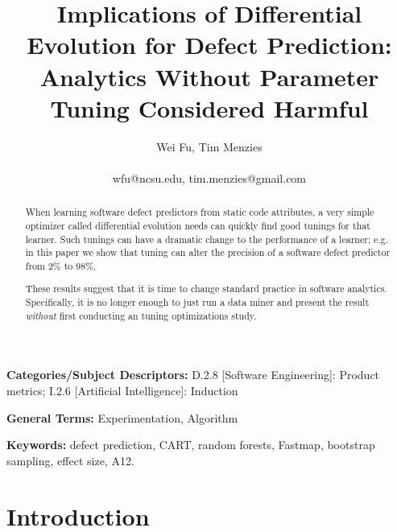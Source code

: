 \documentclass{sig-alternative}
\begin{document}
\title{Implications of Differential Evolution for  Defect Prediction:
Analytics Without Parameter Tuning Considered Harmful}
\author{
\alignauthor
Wei Fu, Tim Menzies\\
       \\
       {wfu@ncsu.edu, tim.menzies@gmail.com}} 


 
\maketitle
\begin{abstract}
When learning
software defect predictors from static code attributes,   a
very simple optimizer called differential evolution needs can quickly
find  good tunings for that learner.
Such tunings can have a dramatic change to the performance of a learner;
e.g. in this paper we show that tuning can alter the precision of
a software defect predictor from 2\% to 98\%.

These results suggest that it is time to change standard practice in
software analytics. Specifically,
it is no longer enough to just run a data miner and present the result
{\em without} first conducting an tuning optimizations study.


\end{abstract}

\vspace{1mm}
\noindent
{\bf Categories/Subject Descriptors:} 
D.2.8 [Software Engineering]: Product metrics;
I.2.6 [Artificial Intelligence]: Induction

\vspace{1mm}
\noindent
{\bf General Terms:} Experimentation, Algorithm

\vspace{1mm}
\noindent
{\bf Keywords:} defect prediction, CART, random forests,
Fastmap,   bootstrap sampling, effect size, A12.

\section{Introduction}

\end{document}
